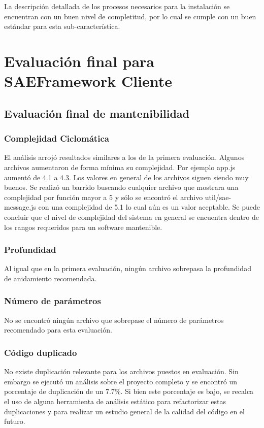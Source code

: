 La descripción detallada de los procesos necesarios para la instalación 
se encuentran con un buen nivel de completitud, por lo cual se cumple con un 
buen estándar para esta sub-característica.

\section{Evaluación final para SAEFramework Cliente}
\subsection{Evaluación final de mantenibilidad}
\subsubsection{Complejidad Ciclomática}
El análisis arrojó resultados similares a los de la primera evaluación. Algunos archivos aumentaron
de forma mínima su complejidad. Por ejemplo app.js aumentó de 4.1 a 4.3.
Los valores en general de los archivos siguen siendo muy buenos.
Se realizó un barrido buscando cualquier archivo que mostrara una complejidad por función mayor
a 5 y sólo se encontró el archivo util/sae-message.js con una complejidad de 5.1 lo cual aún es
un valor aceptable.
Se puede concluir que el nivel de complejidad del sistema en general se encuentra dentro
de los rangos requeridos para un software mantenible.
\subsubsection{Profundidad}
Al igual que en la primera evaluación, ningún archivo sobrepasa la profundidad de anidamiento
recomendada.
\subsubsection{Número de parámetros}
No se encontró ningún archivo que sobrepase el número de parámetros recomendado para
esta evaluación.
\subsubsection{Código duplicado}
No existe duplicación relevante para los archivos puestos en evaluación. Sin embargo se ejecutó
un análisis sobre el proyecto completo y se encontró un porcentaje de duplicación de un 7.7\%.
Si bien este porcentaje es bajo, se recalca el uso de alguna herramienta de análisis estático para
refactorizar estas duplicaciones y para realizar un estudio general de la calidad del código en el futuro.
